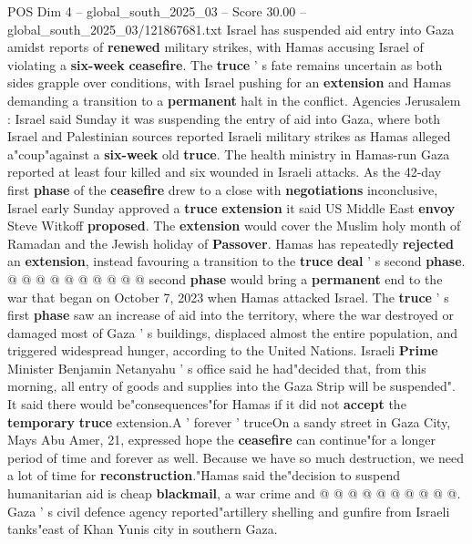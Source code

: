 \begin{textsample}{POS Dim 4 – global\_south\_2025\_03 – Score 30.00 – global\_south\_2025\_03/121867681.txt}  \label{ex:f4_pos_036}
Israel has suspended aid entry into Gaza amidst reports of \textbf{renewed} military strikes, with Hamas accusing Israel of violating a \textbf{six-week} \textbf{ceasefire}.
The \textbf{truce} ' s fate remains uncertain as both sides grapple over conditions, with Israel pushing for an \textbf{extension} and Hamas demanding a transition to a \textbf{permanent} halt in the conflict.
Agencies Jerusalem : Israel said Sunday it was suspending the entry of aid into Gaza, where both Israel and Palestinian sources reported Israeli military strikes as Hamas alleged a"coup"against a \textbf{six-week} old \textbf{truce}.
The health ministry in Hamas-run Gaza reported at least four killed and six wounded in Israeli attacks.
As the 42-day first \textbf{phase} of the \textbf{ceasefire} drew to a close with \textbf{negotiations} inconclusive, Israel early Sunday approved a \textbf{truce} \textbf{extension} it said US Middle East \textbf{envoy} Steve Witkoff \textbf{proposed}.
The \textbf{extension} would cover the Muslim holy month of Ramadan and the Jewish holiday of \textbf{Passover}.
Hamas has repeatedly \textbf{rejected} an \textbf{extension}, instead favouring a transition to the \textbf{truce} \textbf{deal} ' s second \textbf{phase}. @ @ @ @ @ @ @ @ @ @ second \textbf{phase} would bring a \textbf{permanent} end to the war that began on October 7, 2023 when Hamas attacked Israel.
The \textbf{truce} ' s first \textbf{phase} saw an increase of aid into the territory, where the war destroyed or damaged most of Gaza ' s buildings, displaced almost the entire population, and triggered widespread hunger, according to the United Nations.
Israeli \textbf{Prime} Minister Benjamin Netanyahu ' s office said he had"decided that, from this morning, all entry of goods and supplies into the Gaza Strip will be suspended".
It said there would be"consequences"for Hamas if it did not \textbf{accept} the \textbf{temporary} \textbf{truce} extension.A ' forever ' truceOn a sandy street in Gaza City, Mays Abu Amer, 21, expressed hope the \textbf{ceasefire} can continue"for a longer period of time and forever as well.
Because we have so much destruction, we need a lot of time for \textbf{reconstruction}."Hamas said the"decision to suspend humanitarian aid is cheap \textbf{blackmail}, a war crime and @ @ @ @ @ @ @ @ @ @.
Gaza ' s civil defence agency reported"artillery shelling and gunfire from Israeli tanks"east of Khan Yunis city in southern Gaza.

\end{textsample}
